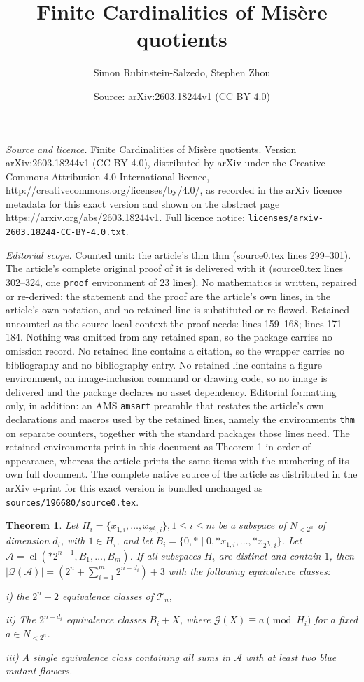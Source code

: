 \documentclass[10pt,a4paper]{amsart}
\title{Finite Cardinalities of Mis\`ere quotients}
\author{Simon Rubinstein-Salzedo, Stephen Zhou}
\date{Source: arXiv:2603.18244v1 (CC BY 4.0)}
\newtheorem{thm}{Theorem}
\DeclareMathOperator{\cl}{cl}
\begin{document}
\maketitle

\noindent\emph{Source and licence.} Finite Cardinalities of Mis\`ere quotients. Version arXiv:2603.18244v1 (CC BY 4.0), distributed by arXiv under the Creative Commons Attribution 4.0 International licence, http://creativecommons.org/licenses/by/4.0/, as recorded in the arXiv licence metadata for this exact version and shown on the abstract page https://arxiv.org/abs/2603.18244v1. Full licence notice: \texttt{licenses/arxiv-2603.18244-CC-BY-4.0.txt}.\par\smallskip

\noindent\textit{Editorial scope.} Counted unit: the article's thm thm (source0.tex lines 299--301). The article's complete original proof of it is delivered with it (source0.tex lines 302--324, one \texttt{proof} environment of 23 lines). No mathematics is written, repaired or re-derived: the statement and the proof are the article's own lines, in the article's own notation, and no retained line is substituted or re-flowed.  Retained uncounted as the source-local context the proof needs: lines 159--168; lines 171--184.  Nothing was omitted from any retained span, so the package carries no omission record.  No retained line contains a citation, so the wrapper carries no bibliography and no bibliography entry.  No retained line contains a figure environment, an image-inclusion command or drawing code, so no image is delivered and the package declares no asset dependency.  Editorial formatting only, in addition: an AMS \texttt{amsart} preamble that restates the article's own declarations and macros used by the retained lines, namely the environments \texttt{thm} on separate counters, together with the standard packages those lines need.  The retained environments print in this document as Theorem 1 in order of appearance, whereas the article prints the same items with the numbering of its own full document.  The complete native source of the article as distributed in the arXiv e-print for this exact version is bundled unchanged as \texttt{sources/196680/source0.tex}.
\begin{thm}
    \label{quotientsize}
    Let $H_i = \{x_{1,i},\dots,x_{2^{d_i},i}\}, 1 \leq i \leq m$ be a subspace of  $N_{<2^n}$ of dimension $d_i$, with $1 \in H_i$, and let $B_i = \{0,*\mid 0,*x_{1,i},\ldots,*x_{2^{d_i},i}\}$. Let $\mathscr{A} = \cl( *2^{n-1},B_1,\ldots,B_m ) $. If all subspaces $H_i$ are distinct and contain $1$, then $\left |\mathcal{Q} (\mathscr{A})\right | = \left( 2^n +\sum_{i=1}^m 2^{n-d_i} \right) +3 $ with the following equivalence classes:

i) the $2^n+2$ equivalence classes of $\mathscr{T}_n$,

ii) The $2^{n-d_i}$ equivalence classes $B_i + X$, where $\mathcal{G}(X) \equiv a \pmod {H_i}$ for a fixed $a \in N_{<2^n}$.

iii) A single equivalence class containing all sums in $\mathscr{A}$ with at least two blue mutant flowers.
\end{thm}
\end{document}
